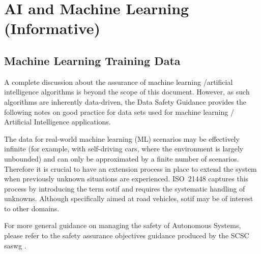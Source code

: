 %
%
\section{AI and Machine Learning (Informative)} \label{bkm:MachineLearning}



\subsection{Machine Learning Training Data}
A complete discussion about the assurance of machine learning /artificial intelligence algorithms is beyond the scope of this document.
However, as such algorithms are inherently data-driven, the Data Safety Guidance provides the following notes on good practice for data sets used for machine learning / Artificial Intelligence applications.

The data for real-world machine learning
(ML)
scenarios may be effectively infinite (for example, with self-driving cars, where the environment is largely unbounded) and can only be approximated by a finite number of scenarios.
Therefore it is crucial to have an extension process in place to extend the system when previously unknown situations are experienced. 
ISO~21448 \cite{citation:ISO21448} captures this process by introducing the term \gls{sotif} and requires the systematic handling of unknowns. Although specifically aimed at road vehicles, \gls{sotif} may be of interest to other domains.

For more general guidance on managing the safety of Autonomous Systems, please refer to the safety assurance objectives guidance produced by the SCSC \gls{saswg} \cite{citation:SASWG:Objectives}.

